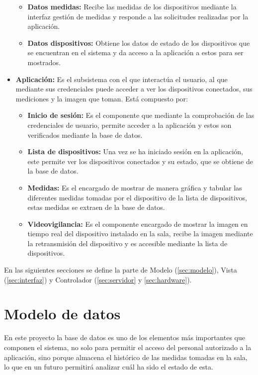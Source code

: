 \begin{itemize}
\begin{itemize}
		      \item \textbf{Datos medidas:} Recibe las medidas de los dispositivos mediante la interfaz gestión de medidas y responde a las solicitudes realizadas por la aplicación.
		      \item \textbf{Datos dispositivos:} Obtiene los datos de estado de los dispositivos que se encuentran en el sistema y da acceso a la aplicación a estos para ser mostrados.
	      \end{itemize}
	\item \textbf{Aplicación:} Es el subsistema con el que interactúa el usuario, al que mediante sus credenciales puede acceder a ver los dispositivos conectados, sus mediciones y la imagen que toman. Está compuesto por:
	      \begin{itemize}
		      \item \textbf{Inicio de sesión:} Es el componente que mediante la comprobación de las credenciales de usuario, permite acceder a la aplicación y estos son verificados mediante la base de datos.
		      \item \textbf{Lista de dispositivos:} Una vez se ha iniciado sesión en la aplicación, este permite ver los dispositivos conectados y su estado, que se obtiene de la base de datos.
		      \item \textbf{Medidas:} Es el encargado de mostrar de manera gráfica y tabular las diferentes medidas tomadas por el dispositivo de la lista de dispositivos, estas medidas se extraen de la base de datos.
		      \item \textbf{Videovigilancia:} Es el componente encargado de mostrar la imagen en tiempo real del dispositivo instalado en la sala, recibe la imagen mediante la retransmisión del dispositivo y es accesible mediante la lista de dispositivos.
	      \end{itemize}
\end{itemize}

En las siguientes secciones se define la parte de Modelo (\autoref{sec:modelo}), Vista (\autoref{sec:interfaz}) y Controlador (\autoref{sec:servidor} y \autoref{sec:hardware}).
\pagebreak

\section{Modelo de datos}\label{sec:modelo}
En este proyecto la base de datos es uno de los elementos más importantes que componen el sistema, no solo para permitir el acceso del personal autorizado a la aplicación, sino porque almacena el histórico de las medidas tomadas en la sala, lo que en un futuro permitirá analizar cuál ha sido el estado de esta.

